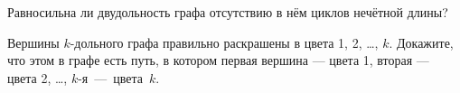 \documentclass[a4paper,11pt]{article}
\begin{document}
 Равносильна ли двудольность графа
отсутствию в н\"ем циклов неч\"етной длины?

Вершины $k$-дольного графа правильно раскрашены в цвета
1, 2, \dots, $k$. Докажите, что этом в графе есть путь,
в котором первая вершина --- цвета 1, вторая --- цвета 2,
\dots, $k$-я~---~цвета~$k$.

















\end{document}
